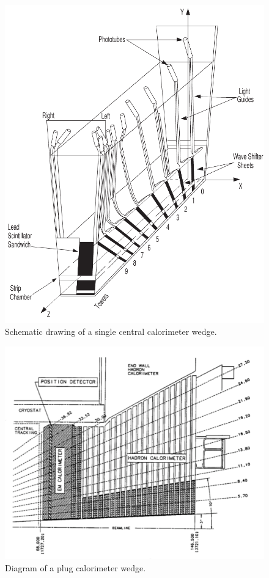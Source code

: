 \begin{figure}[p]
 \centering
 \includegraphics[scale=0.6,keepaspectratio=true]{./cdf_cem_wedge.pdf}
 \caption{Schematic drawing of a single central calorimeter wedge.}
 \label{fig:CEMwedge}
\end{figure}


\begin{figure}[p]
 \centering
 \includegraphics[scale=0.5,keepaspectratio=true]{./plugCalSchem.pdf}
 \caption{Diagram of a plug calorimeter wedge.}
 \label{fig:PlugCalWedge}
\end{figure}

